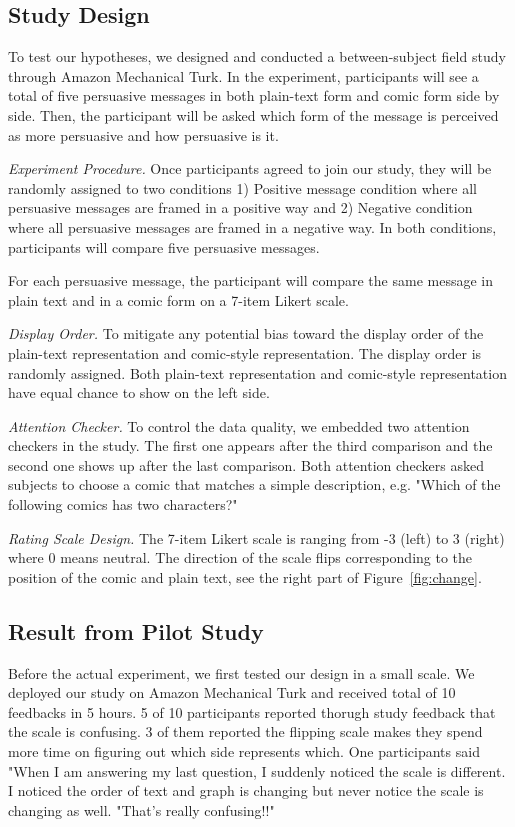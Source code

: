 \subsection{Study Design}
To test our hypotheses, we designed and conducted a between-subject field study through Amazon Mechanical Turk. In the experiment, participants will see a total of five persuasive messages in both plain-text form and comic form side by side. Then, the participant will be asked which form of the message is perceived as more persuasive and how persuasive is it.

\textit{Experiment Procedure.} Once participants agreed to join our study, they will be randomly assigned to two conditions 1) Positive message condition where all persuasive messages are framed in a positive way and 2) Negative condition where all persuasive messages are framed in a negative way. In both conditions, participants will compare five persuasive messages.

For each persuasive message, the participant will compare the same message in plain text and in a comic form on a 7-item Likert scale.

\textit{Display Order.} To mitigate any potential bias toward the display order of the plain-text representation and comic-style representation. The display order is randomly assigned. Both plain-text representation and comic-style representation have equal chance to show on the left side.

\textit{Attention Checker.} To control the data quality, we embedded two attention checkers in the study. The first one appears after the third comparison and the second one shows up after the last comparison. Both attention checkers asked subjects to choose a comic that matches a simple description, e.g. "Which of the following comics has two characters?"

\textit{Rating Scale Design.} The 7-item Likert scale is ranging from -3 (left) to 3 (right) where 0 means neutral. The direction of the scale flips corresponding to the position of the comic and plain text, see the right part of Figure~\ref{fig:change}.


\subsection{Result from Pilot Study}
Before the actual experiment, we first tested our design in a small scale. We deployed our study on Amazon Mechanical Turk and received total of 10 feedbacks in 5 hours. 5 of 10 participants reported thorugh study feedback that the scale is confusing. 3 of them reported the flipping scale makes they spend more time on figuring out which side represents which. One participants said "When I am answering my last question, I suddenly noticed the scale is different. I noticed the order of text and graph is changing but never notice the scale is changing as well. "That's really confusing!!"

